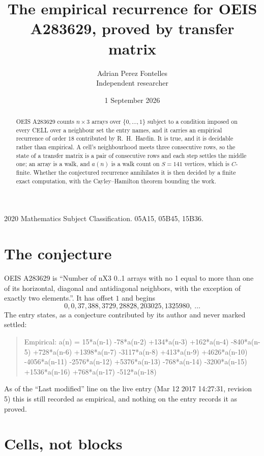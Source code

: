 \documentclass[11pt,a4paper]{article}
\title{The empirical recurrence for OEIS A283629, proved by transfer matrix}
\author{Adrian Perez Fontelles\\ \small Independent researcher}
\date{1 September 2026}
\theoremstyle{plain}
\theoremstyle{definition}
\begin{document}
\maketitle

\begin{abstract}
OEIS A283629 counts $n\times3$ arrays over $\{0,\dots,1\}$ subject to a condition imposed on
every CELL over a neighbour set the entry names, and it carries an empirical recurrence of
order $18$ contributed by R.~H.~Hardin. It is true, and it is decidable rather than
empirical. A cell's neighbourhood meets three consecutive rows, so the state of a transfer
matrix is a pair of consecutive rows and each step settles the middle one; an array is a
walk, and $a(n)$ is a walk count on $S=141$ vertices, which is $C$-finite. Whether the
conjectured recurrence annihilates it is then decided by a finite exact computation, with the
Cayley--Hamilton theorem bounding the work.
\end{abstract}

\noindent\small 2020 Mathematics Subject Classification. 05A15, 05B45, 15B36.\normalsize

\section{The conjecture}

OEIS A283629 is ``Number of nX3 0..1 arrays with no 1 equal to more than one of its horizontal, diagonal and antidiagonal neighbors, with the exception of exactly two elements.''. It has offset $1$ and begins
\[
0, 0, 37, 388, 3729, 28828, 203025, 1325980,\ \dots
\]
The entry states, as a conjecture contributed by its author and never marked settled:
\begin{quote}
Empirical: a(n) = 15*a(n-1) -78*a(n-2) +134*a(n-3) +162*a(n-4) -840*a(n-5) +728*a(n-6) +1398*a(n-7) -3117*a(n-8) +413*a(n-9) +4626*a(n-10) -4056*a(n-11) -2576*a(n-12) +5376*a(n-13) -768*a(n-14) -3200*a(n-15) +1536*a(n-16) +768*a(n-17) -512*a(n-18)
\end{quote}
As of the ``Last modified'' line on the live entry (Mar 12 2017 14:27:31, revision 5) this is still
recorded as empirical, and nothing on the entry records it as proved.

\section{Cells, not blocks}
\end{document}
